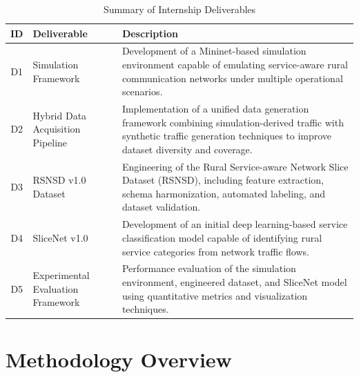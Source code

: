 \documentclass[12pt,a4paper]{report}
\begin{document}
	\begin{table}[H]
		\centering
		\caption{Summary of Internship Deliverables}
		\label{tab:deliverables}
		
		\begin{tabular}{|c|p{4cm}|p{8cm}|}
			\hline
			
			\textbf{ID} &
			\textbf{Deliverable} &
			\textbf{Description} \\
			\hline
			
			D1 &
			Simulation Framework &
			Development of a Mininet-based simulation environment capable of emulating service-aware rural communication networks under multiple operational scenarios. \\
			\hline
			
			D2 &
			Hybrid Data Acquisition Pipeline &
			Implementation of a unified data generation framework combining simulation-derived traffic with synthetic traffic generation techniques to improve dataset diversity and coverage. \\
			\hline
			
			D3 &
			RSNSD v1.0 Dataset &
			Engineering of the Rural Service-aware Network Slice Dataset (RSNSD), including feature extraction, schema harmonization, automated labeling, and dataset validation. \\
			\hline
			
			D4 &
			SliceNet v1.0 &
			Development of an initial deep learning-based service classification model capable of identifying rural service categories from network traffic flows. \\
			\hline
			
			D5 &
			Experimental Evaluation Framework &
			Performance evaluation of the simulation environment, engineered dataset, and SliceNet model using quantitative metrics and visualization techniques. \\
			\hline
			
		\end{tabular}
		
	\end{table}
	
	
	\section{Methodology Overview}
	\label{sec:methodology}
	
\end{document}
